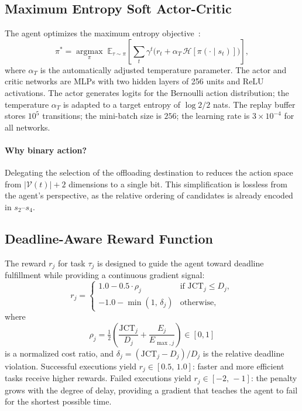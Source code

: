 \subsection{Maximum Entropy Soft Actor-Critic}
\label{sec:sac}

The  agent optimizes the maximum entropy objective~\cite{haarnoja2018sac}:
\begin{equation}
  \pi^* = \operatorname*{argmax}_\pi\;
  \mathbb{E}_{\tau \sim \pi}\!\left[
    \sum_{t} \gamma^t \bigl(r_t + \alpha_T\,\mathcal{H}[\pi(\cdot\mid s_t)]\bigr)
  \right],
  \label{eq:sac_obj}
\end{equation}
where $\alpha_T$ is the automatically adjusted temperature parameter.
The actor and critic networks are MLPs with two hidden layers of 256 units and
ReLU activations.
The actor generates logits for the Bernoulli action distribution; the temperature
$\alpha_T$ is adapted to a target entropy of $\log 2 / 2$ nats.
The replay buffer stores $10^5$ transitions; the mini-batch size is $256$;
the learning rate is $3 \times 10^{-4}$ for all networks.

\paragraph{Why binary action?} Delegating the selection of the offloading destination to  reduces the action space from $|\mathcal{V}(t)| + 2$ dimensions to a single bit. This simplification is lossless from the agent's perspective, as the relative ordering of candidates is already encoded in $s_2$--$s_4$.

\subsection{Deadline-Aware Reward Function}
\label{sec:reward}

The reward $r_j$ for task $\tau_j$ is designed to guide the agent toward
deadline fulfillment while providing a continuous gradient signal:
\begin{equation}
  r_j = \begin{cases}
    1.0 - 0.5 \cdot \rho_j        & \text{if } \mathrm{JCT}_j \le D_j, \\
    -1.0 - \min(1,\,\delta_j)       & \text{otherwise,}
  \end{cases}
  \label{eq:reward}
\end{equation}
where
\begin{equation}
  \rho_j = \tfrac{1}{2}\!\left(\frac{\mathrm{JCT}_j}{D_j}
                              + \frac{E_j}{E_{\max,j}}\right) \in [0,1]
  \label{eq:rho}
\end{equation}
is a normalized cost ratio, and $\delta_j = (\mathrm{JCT}_j - D_j)/D_j$
is the relative deadline violation.
Successful executions yield $r_j \in [0.5,\,1.0]$: faster and more
efficient tasks receive higher rewards.
Failed executions yield $r_j \in [-2,\,-1]$: the penalty grows with the
degree of delay, providing a gradient that teaches the agent to
fail for the shortest possible time.
